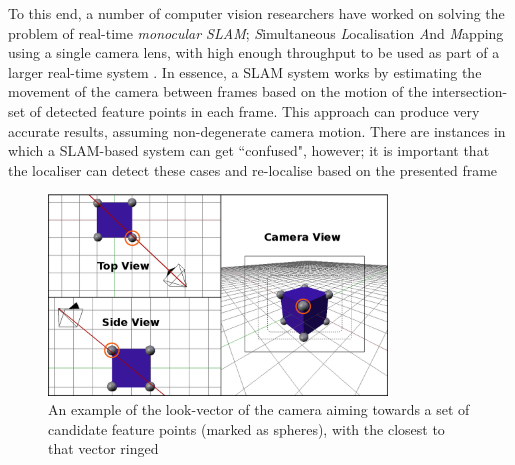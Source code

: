 \documentclass[a4paper,10pt]{article}
\begin{document}
To this end, a number of computer vision researchers have worked on solving the problem of real-time \textit{monocular SLAM}; \textit{S}imultaneous \textit{L}ocalisation \textit{A}nd \textit{M}apping using a single camera lens, with high enough throughput to be used as part of a larger real-time system \cite{slam}. In essence, a SLAM system works by estimating the movement of the camera between frames based on the motion of the intersection-set of detected feature points in each frame. This approach can produce very accurate results, assuming non-degenerate camera motion. There are instances in which a SLAM-based system can get ``confused", however; it is important that the localiser can detect these cases and re-localise based on the presented frame

\begin{figure}
  \begin{center}
    \includegraphics[width=340px]{cameraaim}
  \end{center}
  \caption[An example of the look-vector of the camera aiming towards a set of candidate feature points]{An example of the look-vector of the camera aiming towards a set of candidate feature points (marked as spheres), with the closest to that vector ringed}
  \label{lookvec}
\end{figure}
\end{document}
